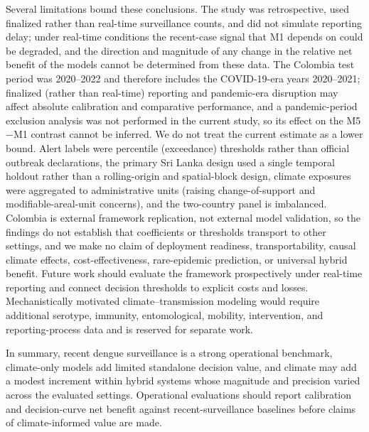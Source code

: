 \documentclass[11pt,a4paper]{article}
\begin{document}
Several limitations bound these conclusions. The study was retrospective, used finalized rather than real-time surveillance counts, and did not simulate reporting delay; under real-time conditions the recent-case signal that M1 depends on could be degraded, and the direction and magnitude of any change in the relative net benefit of the models cannot be determined from these data. The Colombia test period was 2020--2022 and therefore includes the COVID-19-era years 2020--2021; finalized (rather than real-time) reporting and pandemic-era disruption may affect absolute calibration and comparative performance, and a pandemic-period exclusion analysis was not performed in the current study, so its effect on the M5$-$M1 contrast cannot be inferred. We do not treat the current estimate as a lower bound. Alert labels were percentile (exceedance) thresholds rather than official outbreak declarations, the primary Sri Lanka design used a single temporal holdout rather than a rolling-origin and spatial-block design, climate exposures were aggregated to administrative units (raising change-of-support and modifiable-areal-unit concerns), and the two-country panel is imbalanced. Colombia is external framework replication, not external model validation, so the findings do not establish that coefficients or thresholds transport to other settings, and we make no claim of deployment readiness, transportability, causal climate effects, cost-effectiveness, rare-epidemic prediction, or universal hybrid benefit. Future work should evaluate the framework prospectively under real-time reporting and connect decision thresholds to explicit costs and losses. Mechanistically motivated climate--transmission modeling would require additional serotype, immunity, entomological, mobility, intervention, and reporting-process data and is reserved for separate work.

In summary, recent dengue surveillance is a strong operational benchmark, climate-only models add limited standalone decision value, and climate may add a modest increment within hybrid systems whose magnitude and precision varied across the evaluated settings. Operational evaluations should report calibration and decision-curve net benefit against recent-surveillance baselines before claims of climate-informed value are made.

\end{document}
